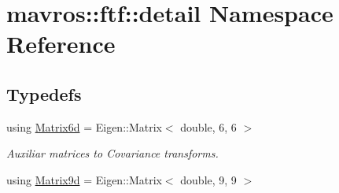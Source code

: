 \hypertarget{namespacemavros_1_1ftf_1_1detail}{}\section{mavros\+::ftf\+::detail Namespace Reference}
\label{namespacemavros_1_1ftf_1_1detail}
\subsection*{Typedefs}
\begin{DoxyCompactItemize}
\item 
using \mbox{\hyperlink{group__nodelib_ga510487eae2b1df3a44a6e645120b0389}{Matrix6d}} = Eigen\+::\+Matrix$<$ double, 6, 6 $>$
\begin{DoxyCompactList}\small\item\em Auxiliar matrices to Covariance transforms. \end{DoxyCompactList}\item 
using \mbox{\hyperlink{group__nodelib_ga8aed658f3bc8ce4b4d5776a82c8ef67e}{Matrix9d}} = Eigen\+::\+Matrix$<$ double, 9, 9 $>$
\end{DoxyCompactItemize}
